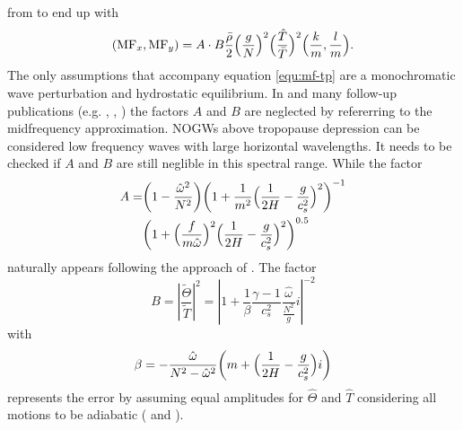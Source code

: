 from \textcite[]{fritts_gravity_2003} to end up with
\begin{equation}
    (\mathrm{MF}_x, \mathrm{MF}_y) = A \cdot B \frac{\bar{\rho}}{2} \Bigl(\frac{g}{N}\Bigr)^2 {\Bigl(\frac{\hat{T}}{\bar{T}}\Bigr)^2} \Bigl(\frac{k}{m},\frac{l}{m}\Bigr).
    \label{equ:mf-tp}
\end{equation}
The only assumptions that accompany equation \ref{equ:mf-tp} are a monochromatic wave perturbation and hydrostatic equilibrium. In \textcite[]{ern_absolute_2004} and many follow-up publications (e.g. \cite[]{preusse_characteristics_2014}, \cite[]{ern_gracile_2018}, \cite[]{hindley_gravity_2019}) the factors $A$ and $B$ are neglected by refererring to the midfrequency approximation. NOGWs above tropopause depression can be considered low frequency waves with large horizontal wavelengths. It needs to be checked if $A$ and $B$ are still neglible in this spectral range. While the factor
\begin{equation}
    \begin{split}
        A = &\biggl(1-\frac{\hat{\omega}^2}{N^2}\biggr) \biggl(1 + \frac{1}{m^2} \Bigl(\frac{1}{2H}-\frac{g}{c_s^2}\Bigr)^2\biggr)^{-1} \\
            &\biggl(1+\Bigl(\frac{f}{m \hat{\omega}}\Bigr)^2 \Bigl(\frac{1}{2H} - \frac{g}{c_s^2}\Bigr)^2\biggr)^{0.5}
    \end{split}
    \label{equ:A}
\end{equation}
naturally appears following the approach of \textcite[]{ern_absolute_2004}. The factor
\begin{equation}
    B = \left| \frac{\tilde{\Theta}}{\tilde{T}} \right|^2 = \left| 1 + \frac{1}{\beta} \frac{\gamma-1}{c_s^2} \frac{\hat{\omega}}{\frac{N^2}{g}}i\right|^{-2}
    \label{equ:B}
\end{equation}
with
\begin{equation}
    \beta = -\frac{\hat{\omega}}{N^2-\hat{\omega}^2} \biggl(m + \Bigl(\frac{1}{2H}-\frac{g}{c_s^2}\Bigr)i\biggr)
    \label{equ:beta}
\end{equation}
represents the error by assuming equal amplitudes for $\hat{\Theta}$ and $\hat{T}$ considering all motions to be adiabatic (\cite[]{fritts_gravity_2003} and \cite[]{ern_directional_2017}).
